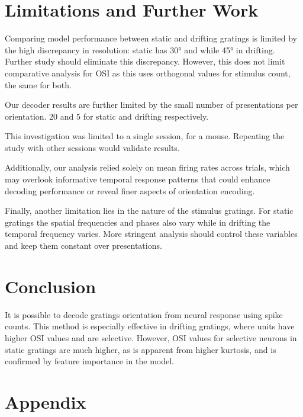 \documentclass[10pt,twocolumn]{article}
\begin{document}
\section{Limitations and Further Work}

Comparing model performance between static and drifting gratings is limited by the high discrepancy in resolution: static has 30° and while 45° in drifting. Further study should eliminate this discrepancy. However, this does not limit comparative analysis for OSI as this uses orthogonal values for stimulus count, the same for both. 

Our decoder results are further limited by the small number of presentations per orientation. 20 and 5 for static and drifting respectively. 

This investigation was limited to a single session, for a mouse. Repeating the study with other sessions would validate results.

Additionally, our analysis relied solely on mean firing rates across trials, which may overlook informative temporal response patterns that could enhance decoding performance or reveal finer aspects of orientation encoding.

Finally, another limitation lies in the nature of the stimulus gratings. For static gratings the spatial frequencies and phases also vary while in drifting the temporal frequency varies. More stringent analysis should control these variables and keep them constant over presentations. 

\section{Conclusion}

It is possible to decode gratings orientation from neural response using spike counts. This method is especially effective in drifting gratings, where units have higher OSI values and are selective. However, OSI values for selective neurons in static gratings are much higher, as is apparent from higher kurtosis, and is confirmed by feature importance in the model.

\newpage

\appendix

\section{Appendix}
\end{document}
